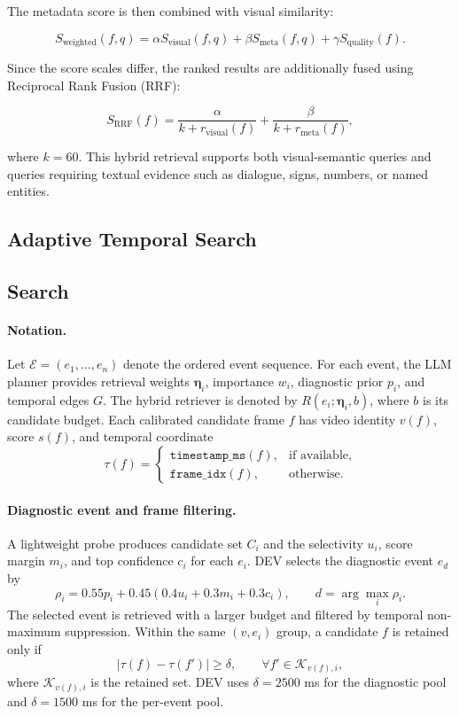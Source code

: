 \documentclass[11pt]{article}
\begin{document}
The metadata score is then combined with visual similarity:

\[
S_{\mathrm{weighted}}(f,q)
=
\alpha S_{\mathrm{visual}}(f,q)
+
\beta S_{\mathrm{meta}}(f,q)
+
\gamma S_{\mathrm{quality}}(f).
\]

Since the score scales differ, the ranked results are additionally fused using
Reciprocal Rank Fusion (RRF):

\[
S_{\mathrm{RRF}}(f)
=
\frac{\alpha}{k+r_{\mathrm{visual}}(f)}
+
\frac{\beta}{k+r_{\mathrm{meta}}(f)},
\]

where $k=60$. This hybrid retrieval supports both visual-semantic queries and
queries requiring textual evidence such as dialogue, signs, numbers, or named
entities.





\subsection{Adaptive Temporal Search}

\subsection{Search}
\label{sec:search}

\paragraph{Notation.}
Let $\mathcal{E}=(e_1,\ldots,e_n)$ denote the ordered event sequence.
For each event, the LLM planner provides retrieval weights $\boldsymbol{\eta}_i$,
importance $w_i$, diagnostic prior $p_i$, and temporal edges $G$. The hybrid
retriever is denoted by $R(e_i;\boldsymbol{\eta}_i,b)$, where $b$ is its
candidate budget. Each calibrated candidate frame $f$ has video identity
$v(f)$, score $s(f)$, and temporal coordinate
\[
\tau(f)=
\begin{cases}
\texttt{timestamp\_ms}(f), & \text{if available},\\
\texttt{frame\_idx}(f), & \text{otherwise}.
\end{cases}
\]

\paragraph{Diagnostic event and frame filtering.}
A lightweight probe produces candidate set $C_i$ and the selectivity $u_i$,
score margin $m_i$, and top confidence $c_i$ for each $e_i$. DEV selects
the diagnostic event $e_d$ by
\[
\rho_i=0.55p_i+0.45(0.4u_i+0.3m_i+0.3c_i),
\qquad d=\arg\max_i\rho_i.
\]
The selected event is retrieved with a larger budget and filtered by temporal
non-maximum suppression. Within the same $(v,e_i)$ group, a candidate $f$ is
retained only if
\[
|\tau(f)-\tau(f')|\geq\delta,
\qquad \forall f'\in\mathcal{K}_{v(f),i},
\]
where $\mathcal{K}_{v(f),i}$ is the retained set. DEV uses $\delta=2500$ ms
for the diagnostic pool and $\delta=1500$ ms for the per-event pool.
\end{document}
